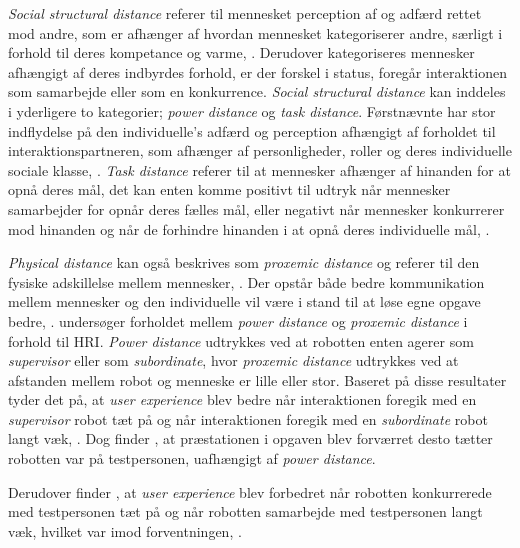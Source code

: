 \textit{Social structural distance} referer til mennesket perception af og adfærd rettet mod andre, som er afhænger af hvordan mennesket kategoriserer andre, særligt i forhold til deres kompetance og varme, \parencite[s. 784]{PDF:HowSocialDistanceShapesHRI}. Derudover kategoriseres mennesker afhængigt af deres indbyrdes forhold, er der forskel i status, foregår interaktionen som samarbejde eller som en konkurrence. \textit{Social structural distance} kan inddeles i yderligere to kategorier; \textit{power distance} og \textit{task distance}. Førstnævnte har stor indflydelse på den individuelle's adfærd og perception afhængigt af forholdet til interaktionspartneren, som afhænger af personligheder, roller og deres individuelle sociale klasse, \parencite[s. 784]{PDF:HowSocialDistanceShapesHRI}. \textit{Task distance} referer til at mennesker afhænger af hinanden for at opnå deres mål, det kan enten komme positivt til udtryk når mennesker samarbejder for opnår deres fælles mål, eller negativt når mennesker konkurrerer mod hinanden og når de forhindre hinanden i at opnå deres individuelle mål, \parencite[s. 784]{PDF:HowSocialDistanceShapesHRI}. 

\textit{Physical distance} kan også beskrives som \textit{proxemic distance} og referer til den fysiske adskillelse mellem mennesker, \parencite[s. 784]{PDF:HowSocialDistanceShapesHRI}. Der opstår både bedre kommunikation mellem mennesker og den individuelle vil være i stand til at løse egne opgave bedre, \parencite[s. 785]{PDF:HowSocialDistanceShapesHRI}.\blankline
%
\textcite[s. 794]{PDF:HowSocialDistanceShapesHRI} undersøger forholdet mellem \textit{power distance} og \textit{proxemic distance} i forhold til HRI. \textit{Power distance} udtrykkes ved at robotten enten agerer som \textit{supervisor} eller som \textit{subordinate}, hvor \textit{proxemic distance} udtrykkes ved at afstanden mellem robot og menneske er lille eller stor. Baseret på disse resultater tyder det på, at \textit{user experience} blev bedre når interaktionen foregik med en \textit{supervisor} robot tæt på og når interaktionen foregik med en \textit{subordinate} robot langt væk, \parencite[s. 785]{PDF:HowSocialDistanceShapesHRI}. Dog finder \textcite[s. 785]{PDF:HowSocialDistanceShapesHRI}, at præstationen i opgaven blev forværret desto tætter robotten var på testpersonen, uafhængigt af \textit{power distance}. 

Derudover finder \textcite[s. 785]{PDF:HowSocialDistanceShapesHRI}, at \textit{user experience} blev forbedret når robotten konkurrerede med testpersonen tæt på og når robotten samarbejde med testpersonen langt væk, hvilket var imod forventningen, \parencite[s. 785]{PDF:HowSocialDistanceShapesHRI}.   














